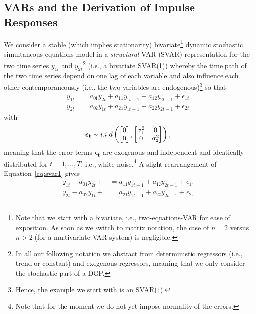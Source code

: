 \documentclass[a4paper,11pt,listof=nochaptergap,oneside,pointednumbers,bibtotoc,bigheadings,liststotoc]{scrbook}
\theoremstyle{mysatz}
\theoremstyle{mydefinition}
\theoremstyle{mybemerkung}
\newcommand{\vect}[1]{\boldsymbol{\mathbf{#1}}}
\begin{document}
\subsection{VARs and the Derivation of Impulse Responses}
We consider a stable (which implies stationarity) bivariate\footnote{Note that we start with a bivariate, i.e., two-equations-VAR for ease of exposition. As soon as we switch to matrix notation, the case of $n=2$ versus $n>2$ (for a multivariate VAR-system) is negligible.} dynamic stochastic simultaneous equations model in a \textit{structural} VAR (SVAR) representation for the two time series $y_{1t}$ and $y_{2t}$\footnote{In all our following notation we abstract from deterministic regressors (i.e., trend or constant) and exogenous regressors, meaning that we only consider the stochastic part of a DGP.} (i.e., a bivariate SVAR(1)) whereby the time path of the two time series depend on one lag of each variable and also influence each other contemporaneously (i.e., the two variables are endogenous)\footnote{Hence, the example we start with is an SVAR($1$).} so that
\begin{equation} \label{eq:svar1}
\begin{split}
	y_{1t} & = a_{01}y_{2t} + a_{11}y_{1t-1} + a_{12}y_{2t-1} + \epsilon_{1t} \\
	y_{2t} & = a_{02}y_{1t} + a_{21}y_{1t-1} + a_{22}y_{2t-1} + \epsilon_{2t}
\end{split}								
\end{equation}
with 
\begin{equation}
\begin{split}
	\vect{\epsilon_t} \thicksim i.i.d \left (  \begin{bmatrix}
    							0 \\
    							0
 							 \end{bmatrix}, \begin{bmatrix}
    							\sigma_{1}^2 & 0  \\
    							0 & \sigma_{2}^2
 							 \end{bmatrix} \right ),
\end{split}								
\end{equation}
meaning that the error terms $\vect{\epsilon_t}$ are exogenous and independent and identically distributed  for $t = 1, \dots, T$, i.e., white noise.\footnote{Note that for the moment we do not yet impose normality of the errors.} A slight rearrangement of Equation~\ref{eq:svar1} gives 
\begin{equation} \label{eq:svar2}
\begin{split}
	y_{1t} - a_{01}y_{2t} + & = a_{11}y_{1t-1} + a_{12}y_{2t-1} + \epsilon_{1t} \\
	y_{2t} - a_{02}y_{1t} +  & = a_{21}y_{1t-1} + a_{22}y_{2t-1} + \epsilon_{2t}
\end{split}								
\end{equation}
\end{document}
